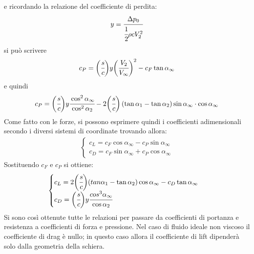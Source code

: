 e ricordando la relazione del coefficiente di perdita:
\begin{align*}
y = \cfrac{\Delta p_0}{\cfrac{1}{2} \rho c V_2^2}
\end{align*}
si può scrivere
\begin{align*}
c_P = \bigg(\cfrac{s}{c}\bigg)y \bigg(\cfrac{V_2}{V_{\infty}}\bigg)^2 - c_F \tan \alpha_{\infty}
\end{align*}
e quindi
\begin{equation}
c_P = \bigg(\cfrac{s}{c}\bigg)y \cfrac{\cos^2 \alpha_{\infty}}{\cos^2 \alpha_2} -2\bigg(\cfrac{s}{c}\bigg) \left(\tan \alpha_1 - \tan \alpha_2 \right) \sin \alpha_{\infty} \cdot \cos \alpha_{\infty}
\end{equation} 
Come fatto con le forze, si possono esprimere quindi i coefficienti adimensionali secondo i diversi sistemi di coordinate trovando allora:
\begin{align*}
\begin{cases}
c_L = c_F \cos \alpha_{\infty} - c_P \sin \alpha_{\infty} \\
c_D = c_F \sin \alpha_{\infty} + c_P \cos \alpha_{\infty}
\end{cases}
\end{align*}
Sostituendo $c_F$ e $c_P$ si ottiene:
\begin{equation}
\begin{cases}
c_L = 2 \bigg(\cfrac{s}{c}\bigg) (tan \alpha_1 - \tan \alpha_2) \cos \alpha_{\infty} - c_D \tan \alpha_{\infty} \\
c_D = \bigg(\cfrac{s}{c}\bigg) y \cfrac{cos^3 \alpha_{\infty}}{\cos \alpha_2}
\end{cases}
\end{equation}
Si sono così ottenute tutte le relazioni per passare da coefficienti di portanza e resistenza a coefficienti di forza e pressione. Nel caso di fluido ideale non viscoso il coefficiente di drag è nullo; in questo caso allora il coefficiente di lift dipenderà solo dalla geometria della schiera.
